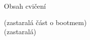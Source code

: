 


\subtitle{V. Paměť}
\date{18. 10. \the\year}



\frame{\titlepage}

\begin{frame}{Obsah cvičení}

   (zastaralá část o bootmem)\\
   (zastaralá)

  \bigskip

  \tableofcontents
\end{frame}




